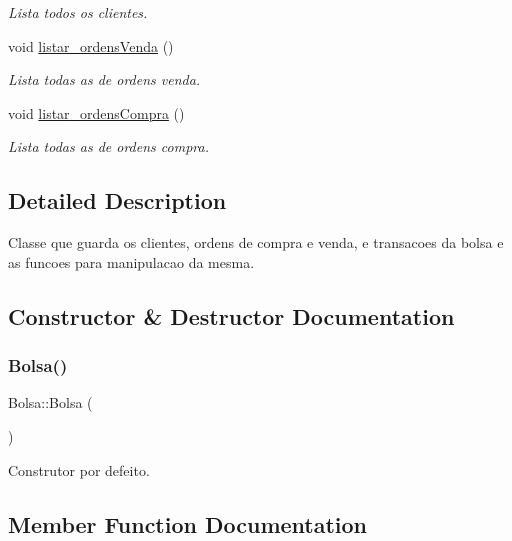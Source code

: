 \begin{DoxyCompactItemize}
\begin{DoxyCompactList}\small\item\em Lista todos os clientes. \end{DoxyCompactList}\item 
void \hyperlink{class_bolsa_abd28d5b93c338a05deccf0adbac23ba1}{listar\+\_\+ordens\+Venda} ()
\begin{DoxyCompactList}\small\item\em Lista todas as de ordens venda. \end{DoxyCompactList}\item 
void \hyperlink{class_bolsa_a419cf3df5db87b4925eb616af1180f88}{listar\+\_\+ordens\+Compra} ()
\begin{DoxyCompactList}\small\item\em Lista todas as de ordens compra. \end{DoxyCompactList}\end{DoxyCompactItemize}


\subsection{Detailed Description}
Classe que guarda os clientes, ordens de compra e venda, e transacoes da bolsa e as funcoes para manipulacao da mesma. 

\subsection{Constructor \& Destructor Documentation}
\hypertarget{class_bolsa_a79eb058719d17c21fab6c4b95db8c1b6}{}\label{class_bolsa_a79eb058719d17c21fab6c4b95db8c1b6} 
\subsubsection{\texorpdfstring{Bolsa()}{Bolsa()}}
{\footnotesize\ttfamily Bolsa\+::\+Bolsa (\begin{DoxyParamCaption}{ }\end{DoxyParamCaption})\hspace{0.3cm}{\ttfamily [inline]}}



Construtor por defeito. 



\subsection{Member Function Documentation}
\hypertarget{class_bolsa_a8bcc217341ffe40e4f2b6d7454977d4d}{}\label{class_bolsa_a8bcc217341ffe40e4f2b6d7454977d4d} 
